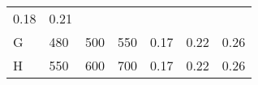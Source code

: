 \documentclass[11pt]{article}
\begin{document}
\begin{longtable}[]{@{}lllllll@{}}
\begin{minipage}[t]{0.04\columnwidth}
0.18\strut
\end{minipage} & \begin{minipage}[t]{0.04\columnwidth}\raggedright\strut
0.21\strut
\end{minipage}\tabularnewline
\begin{minipage}[t]{0.04\columnwidth}\raggedright\strut
G\strut
\end{minipage} & \begin{minipage}[t]{0.04\columnwidth}\raggedright\strut
480\strut
\end{minipage} & \begin{minipage}[t]{0.04\columnwidth}\raggedright\strut
500\strut
\end{minipage} & \begin{minipage}[t]{0.04\columnwidth}\raggedright\strut
550\strut
\end{minipage} & \begin{minipage}[t]{0.04\columnwidth}\raggedright\strut
0.17\strut
\end{minipage} & \begin{minipage}[t]{0.04\columnwidth}\raggedright\strut
0.22\strut
\end{minipage} & \begin{minipage}[t]{0.04\columnwidth}\raggedright\strut
0.26\strut
\end{minipage}\tabularnewline
\begin{minipage}[t]{0.04\columnwidth}\raggedright\strut
H\strut
\end{minipage} & \begin{minipage}[t]{0.04\columnwidth}\raggedright\strut
550\strut
\end{minipage} & \begin{minipage}[t]{0.04\columnwidth}\raggedright\strut
600\strut
\end{minipage} & \begin{minipage}[t]{0.04\columnwidth}\raggedright\strut
700\strut
\end{minipage} & \begin{minipage}[t]{0.04\columnwidth}\raggedright\strut
0.17\strut
\end{minipage} & \begin{minipage}[t]{0.04\columnwidth}\raggedright\strut
0.22\strut
\end{minipage} & \begin{minipage}[t]{0.04\columnwidth}\raggedright\strut
0.26\strut
\end{minipage}\tabularnewline
\bottomrule
\end{longtable}
\end{document}
